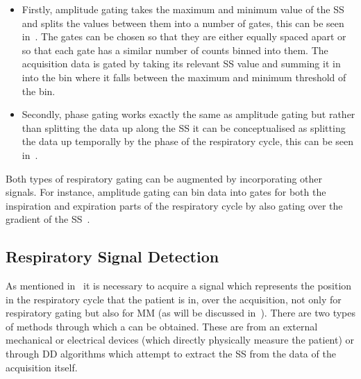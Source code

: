             \begin{itemize}
                \item Firstly, amplitude gating takes the maximum and minimum value of the \gls{SS} and splits the values between them into a number of gates, this can be seen in~. The gates can be chosen so that they are either equally spaced apart or so that each gate has a similar number of counts binned into them. The acquisition data is gated by taking its relevant \gls{SS} value and summing it in into the bin where it falls between the maximum and minimum threshold of the bin.
                
                \item Secondly, phase gating works exactly the same as amplitude gating but rather than splitting the data up along the \gls{SS} it can be conceptualised as splitting the data up temporally by the phase of the respiratory cycle, this can be seen in~.
            \end{itemize}
            
            Both types of respiratory gating can be augmented by incorporating other signals. For instance, amplitude gating can bin data into gates for both the inspiration and expiration parts of the respiratory cycle by also gating over the gradient of the \gls{SS}~\parencite{Low2005}.
        
        \subsection{Respiratory Signal Detection} \label{sec:respiratory_signal_detection}
            As mentioned in~ it is necessary to acquire a signal which represents the position in the respiratory cycle that the patient is in, over the acquisition, not only for respiratory gating but also for \gls{MM} (as will be discussed in~). There are two types of methods through which a  can be obtained. These are from an external mechanical or electrical devices (which directly physically measure the patient) or through \gls{DD} algorithms which attempt to extract the \gls{SS} from the data of the acquisition itself.
            
